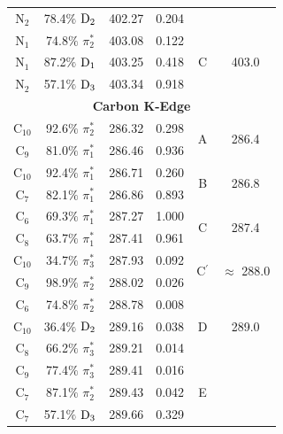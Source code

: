 \documentclass[8.5pt,twoside,twocolumn]{article}
\begin{document}
\begin{table}[!ht]
\begin{tabular*}{8.5cm}{@{\extracolsep{\fill} }cccccc}
    N$_2$
 &   78.4$\%$ $\rm D_2$  & 402.27 & 0.204
 \vspace{0.05in}\\ 
    N$_1$
 &   74.8$\%$ $\pi_2^*$  & 403.08 & 0.122 & \multirow{3}{*}{C} & \multirow{3}{*}{403.0} \\
    N$_1$
 &   87.2$\%$ $\rm D_1$  & 403.25 & 0.418 \\
    N$_2$
 &   57.1$\%$ $\rm D_3$  & 403.34 & 0.918
 \vspace{0.05in}\\
 \multicolumn{6}{c}{\textbf{Carbon K-Edge}} \vspace{0.05in}\\
     C$_{10}$
 &   92.6$\%$ $\pi_2^*$  & 286.32 & 0.298 & \multirow{2}{*}{A} & \multirow{2}{*}{286.4}\\
    C$_9$
 &   81.0$\%$ $\pi_1^*$  & 286.46 & 0.936 
 \vspace{0.05in}\\
    C$_{10}$
 &   92.4$\%$ $\pi_1^*$  & 286.71 & 0.260 &  \multirow{2}{*}{B} &  \multirow{2}{*}{286.8} \\
    C$_7$
 &   82.1$\%$ $\pi_1^*$  & 286.86 & 0.893 
 \vspace{0.05in}\\
    C$_6$
 &   69.3$\%$ $\pi_1^*$  & 287.27 & 1.000 &  \multirow{2}{*}{C} &  \multirow{2}{*}{287.4}\\
    C$_8$
 &   63.7$\%$ $\pi_1^*$  & 287.41 & 0.961 
 \vspace{0.05in}\\
    C$_{10}$
 &   34.7$\%$ $\pi_3^*$  & 287.93 & 0.092 & \multirow{2}{*}{C$^{\prime}$} &  \multirow{2}{*}{$\approx$ 288.0}\\
    C$_9$
 &   98.9$\%$ $\pi_2^*$
 & 288.02 & 0.026 
 \vspace{0.05in}\\
    C$_6$
 &   74.8$\%$ $\pi_2^*$  & 288.78 & 0.008 & \multirow{3}{*}{D} & \multirow{3}{*}{289.0} \\
    C$_{10}$
 &   36.4$\%$ $\rm D_2$  & 289.16 & 0.038 \\
    C$_8$
 &   66.2$\%$ $\pi_3^*$  & 289.21 & 0.014 
 \vspace{0.05in}\\
    C$_9$
 &   77.4$\%$ $\pi_3^*$  & 289.41 & 0.016 & \multirow{3}{*}{E} \\
    C$_7$
 &   87.1$\%$ $\pi_2^*$  & 289.43 & 0.042 \\
    C$_7$
 &   57.1$\%$ $\rm D_3$  & 289.66 & 0.329 
 \vspace{0.05in}\\ 

\end{tabular*}
\end{table}
\end{document}
